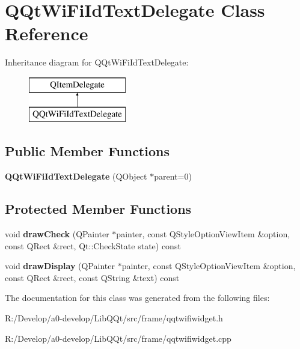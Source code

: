 \hypertarget{class_q_qt_wi_fi_id_text_delegate}{}\section{Q\+Qt\+Wi\+Fi\+Id\+Text\+Delegate Class Reference}
\label{class_q_qt_wi_fi_id_text_delegate}
Inheritance diagram for Q\+Qt\+Wi\+Fi\+Id\+Text\+Delegate\+:\begin{figure}[H]
\begin{center}
\leavevmode
\includegraphics[height=2.000000cm]{class_q_qt_wi_fi_id_text_delegate}
\end{center}
\end{figure}
\subsection*{Public Member Functions}
\begin{DoxyCompactItemize}
\item 
\mbox{\label{class_q_qt_wi_fi_id_text_delegate_a1c46d666410a8815b3a0e67526eec32f}} 
{\bfseries Q\+Qt\+Wi\+Fi\+Id\+Text\+Delegate} (Q\+Object $\ast$parent=0)
\end{DoxyCompactItemize}
\subsection*{Protected Member Functions}
\begin{DoxyCompactItemize}
\item 
\mbox{\label{class_q_qt_wi_fi_id_text_delegate_a6e2ee73e5cfe4f8cbba6fa6bce614805}} 
void {\bfseries draw\+Check} (Q\+Painter $\ast$painter, const Q\+Style\+Option\+View\+Item \&option, const Q\+Rect \&rect, Qt\+::\+Check\+State state) const
\item 
\mbox{\label{class_q_qt_wi_fi_id_text_delegate_ad539e6f326cdf980d8a22fd06ce097f4}} 
void {\bfseries draw\+Display} (Q\+Painter $\ast$painter, const Q\+Style\+Option\+View\+Item \&option, const Q\+Rect \&rect, const Q\+String \&text) const
\end{DoxyCompactItemize}


The documentation for this class was generated from the following files\+:\begin{DoxyCompactItemize}
\item 
R\+:/\+Develop/a0-\/develop/\+Lib\+Q\+Qt/src/frame/qqtwifiwidget.\+h\item 
R\+:/\+Develop/a0-\/develop/\+Lib\+Q\+Qt/src/frame/qqtwifiwidget.\+cpp\end{DoxyCompactItemize}

